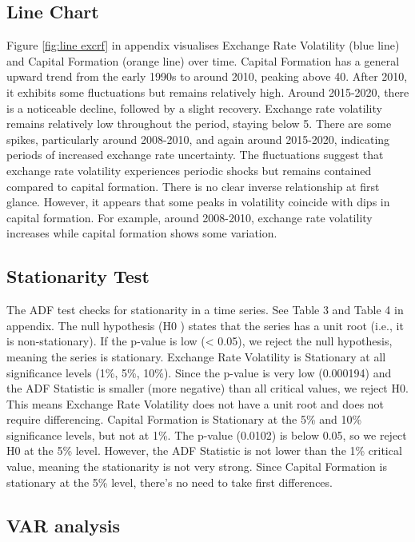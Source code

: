 \documentclass{article} %
\begin{document}


\subsection{Line Chart}


Figure \ref{fig:line excrf} in appendix visualises Exchange Rate Volatility (blue line) and Capital Formation (orange line) over
time. Capital Formation has a general upward trend from the early 1990s to around 2010, peaking above 40. After 2010, it exhibits some fluctuations but remains relatively high. Around 2015-2020, there is a noticeable decline, followed by a slight recovery. Exchange rate volatility remains
relatively low throughout the period, staying below 5. There are some spikes, particularly around 2008-2010, and again around 2015-2020, indicating periods of increased exchange rate uncertainty. The fluctuations suggest that exchange rate volatility experiences periodic shocks but remains contained compared to capital formation. There is no clear inverse relationship at first glance. However, it appears that some peaks in volatility coincide with dips in capital formation. For example, around 2008-2010, exchange rate volatility increases while capital formation shows some variation.
\subsection{Stationarity Test}
The ADF test checks for stationarity in a time series. See Table 3 and Table 4 in appendix. The null hypothesis (H0 ) states that the series has a unit root (i.e., it is non-stationary). If the p-value is low (< 0.05), we reject the null hypothesis, meaning the series is stationary. Exchange Rate Volatility is Stationary at all significance levels (1\%, 5\%, 10\%). Since the p-value is very low (0.000194) and the ADF Statistic is smaller (more negative) than all critical values, we reject H0. This means
Exchange Rate Volatility does not have a unit root and does not require differencing. Capital Formation is Stationary at the 5\% and 10\% significance levels, but not at 1\%. The p-value (0.0102) is below 0.05, so we reject H0 at the 5\% level. However, the ADF Statistic is not lower than the 1\% critical value, meaning the stationarity is not very strong. Since Capital Formation is stationary at the 5\% level, there's no need to take first differences.



\subsection{VAR analysis}
\end{document}
